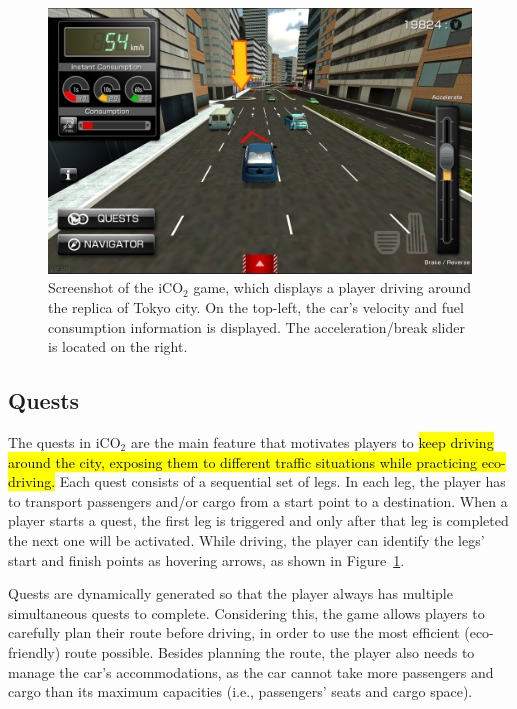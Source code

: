 \documentclass[preprint,authoryear,12pt]{elsarticle}
\newcommand{\hlc}[2][yellow]{ {\sethlcolor{#1} \hl{#2}} }
\begin{document}
\begin{figure}[htb]
\begin{center}
\includegraphics[width=.95\linewidth]{ijhcs14-img/iCO2_driving}
\caption{Screenshot of the iCO$_2$ game, which displays a player driving around the replica of Tokyo city. On the top-left, the car's velocity and fuel consumption information is displayed. The acceleration/break slider is located on the right.\label{fig:iCO2_driving}}
\end{center}
\end{figure}

\subsection{Quests}
\label{subsec:quests}

The quests in iCO$_2$ are the main feature that motivates players to
\hlc[green]{ keep driving around the city, exposing them to different traffic situations 
	while practicing eco-driving.} Each quest consists of a sequential set of legs. In each leg, the player has to transport passengers and/or cargo from a start point to a destination. When a player starts a quest, the first leg is triggered and only after that leg is completed the next one will be activated. While driving, the player can identify the legs' start and finish points as hovering arrows, as shown in Figure~\ref{fig:iCO2_driving}.

Quests are dynamically generated so that the player always has multiple simultaneous quests to complete. Considering this, the game allows players to carefully plan their route before driving, in order to use the most efficient (eco-friendly) route possible. Besides planning the route, the player also needs to manage the car's accommodations, as the car cannot take more passengers and cargo than its maximum capacities (i.e., passengers' seats and cargo space).
\end{document}
